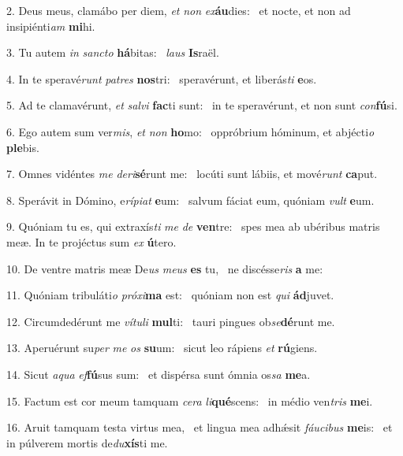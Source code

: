2. Deus meus, clamábo per diem, \textit{et} \textit{non} \textit{ex}\textbf{áu}dies: \ast\  et nocte, et non ad insipiénti\textit{am} \textbf{mi}hi.\

3. Tu autem \textit{in} \textit{sanc}\textit{to} \textbf{há}bitas: \ast\  \textit{laus} \textbf{Is}raël.\

4. In te speravé\textit{runt} \textit{pa}\textit{tres} \textbf{nos}tri: \ast\  speravérunt, et liberás\textit{ti} \textbf{e}os.\

5. Ad te clamavérunt, \textit{et} \textit{sal}\textit{vi} \textbf{fac}ti sunt: \ast\  in te speravérunt, et non sunt \textit{con}\textbf{fú}si.\

6. Ego autem sum ver\textit{mis}, \textit{et} \textit{non} \textbf{ho}mo: \ast\  oppróbrium hóminum, et abjécti\textit{o} \textbf{ple}bis.\

7. Omnes vidéntes \textit{me} \textit{de}\textit{ri}\textbf{sé}runt me: \ast\  locúti sunt lábiis, et mové\textit{runt} \textbf{ca}put.\

8. Sperávit in Dómino, e\textit{rí}\textit{pi}\textit{at} \textbf{e}um: \ast\  salvum fáciat eum, quóniam \textit{vult} \textbf{e}um.\

9. Quóniam tu es, qui extraxís\textit{ti} \textit{me} \textit{de} \textbf{ven}tre: \ast\  spes mea ab ubéribus matris meæ. In te projéctus sum \textit{ex} \textbf{ú}tero.\

10. De ventre matris meæ De\textit{us} \textit{me}\textit{us} \textbf{es} tu, \ast\  ne discésse\textit{ris} \textbf{a} me:\

11. Quóniam tribuláti\textit{o} \textit{pró}\textit{xi}\textbf{ma} est: \ast\  quóniam non est \textit{qui} \textbf{ád}juvet.\

12. Circumdedérunt me \textit{ví}\textit{tu}\textit{li} \textbf{mul}ti: \ast\  tauri pingues ob\textit{se}\textbf{dé}runt me.\

13. Aperuérunt su\textit{per} \textit{me} \textit{os} \textbf{su}um: \ast\  sicut leo rápiens \textit{et} \textbf{rú}giens.\

14. Sicut \textit{a}\textit{qua} \textit{ef}\textbf{fú}sus sum: \ast\  et dispérsa sunt ómnia os\textit{sa} \textbf{me}a.\

15. Factum est cor meum tamquam \textit{ce}\textit{ra} \textit{li}\textbf{qué}scens: \ast\  in médio ven\textit{tris} \textbf{me}i.\

16. Aruit tamquam testa virtus mea, \dag\  et lingua mea adhǽsit \textit{fáu}\textit{ci}\textit{bus} \textbf{me}is: \ast\  et in púlverem mortis de\textit{du}\textbf{xís}ti me.\

